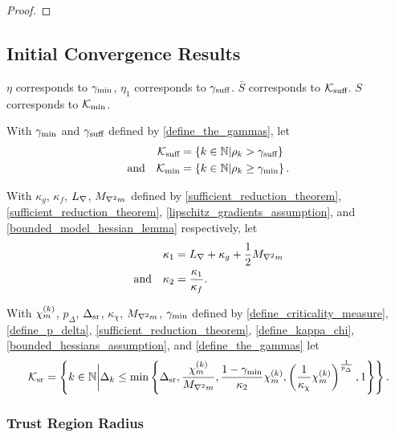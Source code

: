 \begin{proof}
\end{proof}



\subsection{Initial Convergence Results}
\label{initial_convergence_results}
\begin{boxedcomment}
$\eta$ corresponds to $\gamma_{\textrm{min}}$, $\eta_1$ corresponds to $\gamma_{\textrm{suff}}$.
$\bar S$ corresponds to ${\mathcal K_{\textrm{suff}}}$.
$S$ corresponds to ${\mathcal K_{\textrm{min}}}$.
\end{boxedcomment}


With 
$\gamma_{\textrm{min}}$ and $\gamma_{\textrm{suff}}$
defined by \cref{define_the_gammas},
let
\begin{align}
{\mathcal K_{\textrm{suff}}} &= \left\{k \in \mathbb N | \rho_k > \gamma_{\textrm{suff}} \right\} \label{define_suffiterates} \\
\textrm{and} \quad {\mathcal K_{\textrm{min}}} &= \left\{k \in \mathbb N | \rho_k \ge \gamma_{\textrm{min}} \right\} \label{define_miniterates}.
\end{align}

With
$\kappa_g$, $\kappa_f$, ${L_{\nabla}}$, ${M_{\nabla^2 m}}$
defined by
\cref{sufficient_reduction_theorem}, \cref{sufficient_reduction_theorem}, \cref{lipschitz_gradients_assumption}, and \cref{bounded_model_hessian_lemma}
respectively, let
\begin{align}
{\kappa_1} &= {L_{\nabla}} + \kappa_{g} + \frac 1 2 {M_{\nabla^2 m}} \label{define_theircnot} \\
\textrm{and} \quad {\kappa_2} &= \frac{{\kappa_1}}{\kappa_f} .  \label{define_theirc}
\end{align}

With
${\chi_m^{(k)}}$, $p_{\Delta}$, ${\Delta_{\textrm{sr}}}$, $\kappa_{\chi}$, ${M_{\nabla^2 m}}$, $\gamma_{\textrm{min}}$
defined by 
\cref{define_criticality_measure}, \cref{define_p_delta}, \cref{sufficient_reduction_theorem}, \cref{define_kappa_chi}, \cref{bounded_hessians_assumption}, and \cref{define_the_gammas}
let
\begin{align}
\label{define_reduceiterates}
{\mathcal K_{\textrm{sr}}} = \left \{ k \in \mathbb N \bigg| \Delta_k \le \min \left\{ 
{\Delta_{\textrm{sr}}}, 
\frac {{\chi_m^{(k)}}}{{M_{\nabla^2 m}}}, 
\frac{1-\gamma_{\textrm{min}}}{{\kappa_2}}{\chi_m^{(k)}},
\left(\frac 1 {\kappa_{\chi}}  {\chi_m^{(k)}}\right)^{\frac 1 {p_{\Delta}}}, 
1
\right\} \right \}.
\end{align}

\subsubsection{Trust Region Radius}

